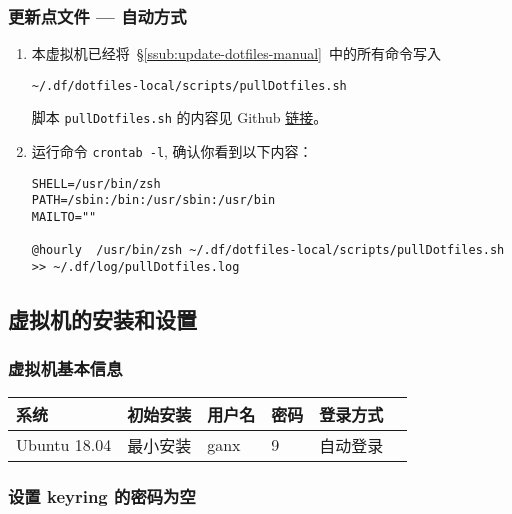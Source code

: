 \documentclass[
    11pt,
    cite=authoryear,
    device=phone,
    lang=cn,
    mode=simple,
    result=answer,
    toc=onecol,
]{elegantbook_sierxue}
\begin{document}
\subsubsection{更新点文件 --- 自动方式}%
\label{ssub:update-dotfiles-crontab}

\begin{enumerate}
    \item 本虚拟机已经将~\S\ref{ssub:update-dotfiles-manual}~中的所有命令写入
\begin{lstlisting}[escapeinside=``]
~/.df/dotfiles-local/scripts/pullDotfiles.sh
\end{lstlisting}
        脚本 \lstinline{pullDotfiles.sh} 的内容见 Github
        \href{https://github.com/ddpom/scripts/blob/master/pullDotfiles.sh}
        {链接}。
    \item 运行命令 \lstinline{crontab -l}, 确认你看到以下内容：
\begin{lstlisting}[escapeinside=``]
SHELL=/usr/bin/zsh
PATH=/sbin:/bin:/usr/sbin:/usr/bin
MAILTO=""

@hourly  /usr/bin/zsh ~/.df/dotfiles-local/scripts/pullDotfiles.sh >> ~/.df/log/pullDotfiles.log
\end{lstlisting}
\end{enumerate}

\subsection{虚拟机的安装和设置}%
\label{sub:vbox-vm-install-set}

\subsubsection{虚拟机基本信息}%
\label{ssub:linux-ubuntu}

\begin{table}[H]
   \centering
     \begin{tabular}{llllll}
     \toprule
     系统 & 初始安装 & 用户名 & 密码 & 登录方式 \\
     \midrule
     Ubuntu 18.04 & 最小安装 & ganx   & 9 & 自动登录\\
     \bottomrule
     \end{tabular}%
   \label{tab:theorem-class}%
\end{table}%

\subsubsection{设置 keyring 的密码为空}%
\label{ssub:vm-keyring}
\end{document}
